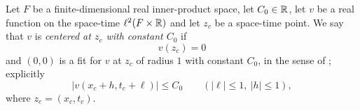 \begin{definition}
Let $F$ be a finite-dimensional real inner-product space, let $C_0\in\mathbb{R}$, let
$v$ be a real function on the space-time $\ell^2(F\times\mathbb{R})$ and let $z_c$ be a
space-time point. We say that $v$ is \emph{centered at $z_c$ with constant
$C_0$} if
\[
  v(z_c)=0
\]
and $(0,0)$ is a fit for $v$ at $z_c$ of radius $1$ with constant $C_0$, in the
sense of ; explicitly
\[
  |v(x_c+h,t_c+\ell)|\le C_0
  \qquad(|\ell|\le1,\ |h|\le1),
\]
where $z_c=(x_c,t_c)$.
\end{definition}
